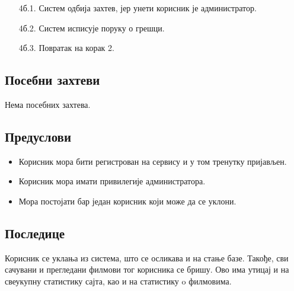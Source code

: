 \begin{enumerate}
    \item [4б.1.] Систем одбија захтев, јер унети корисник је администратор.
    \item [4б.2.] Систем исписује поруку о грешци.
    \item [4б.3.] Повратак на корак 2.
\end{enumerate}

\subsection{Посебни захтеви}

Нема посебних захтева.

\subsection{Предуслови}

\begin{itemize}
    \item Корисник мора бити регистрован на сервису и у том тренутку пријављен.
    \item Корисник мора имати привилегије администратора.
    \item Мора постојати бар један корисник који може да се уклони.
\end{itemize}

\subsection{Последице}

Корисник се уклања из система, што се осликава и на стање базе. Такође, сви сачувани и прегледани
филмови тог корисника се бришу. Ово има утицај и на свеукупну статистику сајта, као и на
статистику o филмовима.
